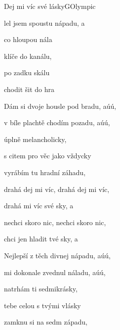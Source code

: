 \setcounter{page}{19}
\begin{song}{Dej mi víc své lásky}{G}{Olympic}

\begin{SBVerse}

lel jsem spoustu nápadu, a

co  hloupou nála

 klíče do kanálu,

 po zadku  skálu

 chodit šit do hra

\end{SBVerse}

\begin{SBVerse}

Dám si dvoje housle pod bradu, aúú,

v bíle plachtě chodím pozadu, aúú,

úplně melancholicky,

s citem pro věc jako vždycky

vyrábím tu hradní záhadu, 

\end{SBVerse}

\begin{SBChorus}

 drahá dej mi víc,  drahá dej mi víc,

 drahá  mi víc své sky, a

 nechci skoro nic, nechci skoro nic,

 chci jen hladit tvé sky, a

\end{SBChorus}

\begin{SBVerse}

Nejlepší z těch divnej nápadu, aúú,

mi dokonale zvednul náladu, aúú,

natrhám ti sedmikrásky,

tebe celou s tvými vlásky

zamknu si na sedm západu, 

\end{SBVerse}

\begin{SBChorus}

\end{SBChorus}

\end{song}

\clearpage
